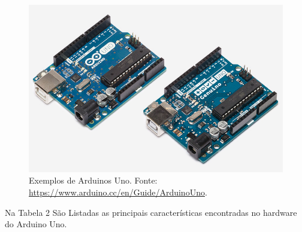 \FloatBarrier
\begin{figure}[!htbp]
	\centering
	\includegraphics[scale=0.7]{imagens/Uno}
	\caption{Exemplos de Arduinos Uno. Fonte:  \url{https://www.arduino.cc/en/Guide/ArduinoUno}. }
	
	\label{fig:ArduinoUno}
\end{figure}
\FloatBarrier

Na Tabela 2 São Listadas as principais características encontradas no hardware do Arduino Uno.

